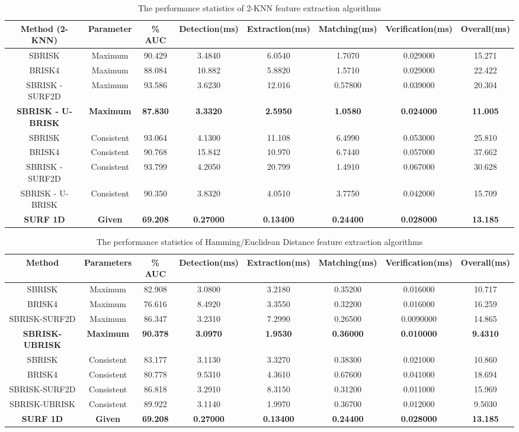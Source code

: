 \documentclass{article}
\begin{document}
\begin{table}
\centering
\caption{The performance statistics of 2-KNN feature extraction algorithms}
\footnotesize
\begin{tabular}{|c|c|c|c|c|c|c|c|}
\hline 
\textbf{Method (2-KNN)} & Parameter & \% AUC & Detection(ms) & Extraction(ms) & Matching(ms) & Verification(ms) & Overall(ms)\tabularnewline
\hline 
\hline 
SBRISK & Maximum & 90.429 & 3.4840 & 6.0540 & 1.7070 & 0.029000 & 15.271\tabularnewline
\hline 
BRISK4 & Maximum & 88.084 & 10.882 & 5.8820 & 1.5710 & 0.029000 & 22.422\tabularnewline
\hline 
SBRISK - SURF2D & Maximum & 93.586 & 3.6230 & 12.016 & 0.57800 & 0.039000 & 20.304\tabularnewline
\hline 
\textbf{SBRISK - U-BRISK} & \textbf{Maximum} & \textbf{87.830} & \textbf{3.3320} & \textbf{2.5950} & \textbf{1.0580} & \textbf{0.024000} & \textbf{11.005}\tabularnewline
\hline 
SBRISK & Consistent & 93.064 & 4.1300 & 11.108 & 6.4990 & 0.053000 & 25.810\tabularnewline
\hline 
BRISK4 & Consistent & 90.768 & 15.842 & 10.970 & 6.7440 & 0.057000 & 37.662\tabularnewline
\hline 
SBRISK - SURF2D & Consistent & 93.799 & 4.2050 & 20.799 & 1.4910 & 0.067000 & 30.628\tabularnewline
\hline 
SBRISK - U-BRISK & Consistent & 90.350 & 3.8320 & 4.0510 & 3.7750 & 0.042000 & 15.709\tabularnewline
\hline 
\textbf{SURF 1D} & \textbf{Given} & \textbf{69.208} & \textbf{0.27000} & \textbf{0.13400} & \textbf{0.24400} & \textbf{0.028000} & \textbf{13.185}\tabularnewline
\hline 
\end{tabular}
\label{tab:overallknn}
\end{table}

\begin{table}
\centering
\caption{The performance statistics of Hamming/Euclidean Distance feature extraction algorithms}
\footnotesize
\begin{tabular}{|c|c|c|c|c|c|c|c|}
\hline 
Method & Parameters & \% AUC & Detection(ms) & Extraction(ms) & Matching(ms) & Verification(ms) & Overall(ms)\tabularnewline
\hline 
\hline 
SBRISK & Maximum & 82.908 & 3.0800 & 3.2180 & 0.35200 & 0.016000 & 10.717\tabularnewline
\hline 
BRISK4 & Maximum & 76.616 & 8.4920 & 3.3550 & 0.32200 & 0.016000 & 16.259\tabularnewline
\hline 
SBRISK-SURF2D & Maximum & 86.347 & 3.2310 & 7.2990 & 0.26500 & 0.0090000 & 14.865\tabularnewline
\hline 
\textbf{SBRISK-UBRISK} & \textbf{Maximum} & \textbf{90.378} & \textbf{3.0970} & \textbf{1.9530} & \textbf{0.36000} & \textbf{0.010000} & \textbf{9.4310}\tabularnewline
\hline 
SBRISK & Consistent & 83.177 & 3.1130 & 3.3270 & 0.38300 & 0.021000 & 10.860\tabularnewline
\hline 
BRISK4 & Consistent & 80.778 & 9.5310 & 4.3610 & 0.67600 & 0.041000 & 18.694\tabularnewline
\hline 
SBRISK-SURF2D & Consistent & 86.818 & 3.2910 & 8.3150 & 0.31200 & 0.011000 & 15.969\tabularnewline
\hline 
SBRISK-UBRISK & Consistent & 89.922 & 3.1140 & 1.9970 & 0.36700 & 0.012000 & 9.5030\tabularnewline
\hline 
\textbf{SURF 1D} & \textbf{Given} & \textbf{69.208} & \textbf{0.27000} & \textbf{0.13400} & \textbf{0.24400} & \textbf{0.028000} & \textbf{13.185}\tabularnewline
\hline 
\end{tabular}
\label{tab:overallhammingeuclidean}
\end{table}
\end{document}
